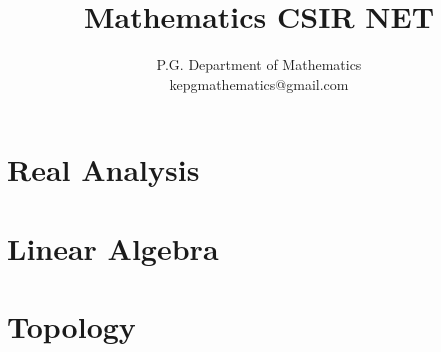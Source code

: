 \documentclass[a4paper,10pt]{book}
\title{Mathematics CSIR NET}
\author{P.G. Department of Mathematics\\ kepgmathematics@gmail.com}
\date{}
\begin{document}
 \chapter{Real Analysis}
 
 
 
 
 
 
 
 
 

 \chapter{Linear Algebra}
 
 
 
 
 
 

%
%
%
%

%

%

%
%
%
%
%

\chapter{Topology}


%
%

%
%
\end{document}
